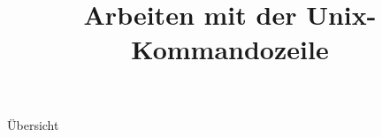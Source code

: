 

\title[Unix]{Arbeiten mit der Unix-Kommandozeile}



{
  \begin{frame}
    \titlepage
  \end{frame}
}

\begin{frame}{Übersicht}
  \tableofcontents
\end{frame}




